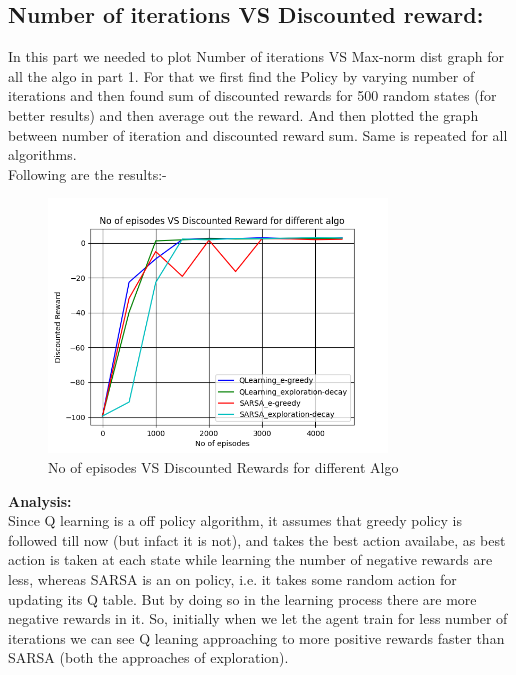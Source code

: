\documentclass{article}
\begin{document}
\begin{enumerate}[a)]
\subsection{Number of iterations VS Discounted reward:}
In this part we needed to plot Number of iterations VS Max-norm dist graph for all the algo in part 1. For that we first find the Policy by varying number of iterations and then found 
sum of discounted rewards for 500 random states (for better results) and then average out the reward. And then plotted the graph between number of iteration and discounted reward sum. Same is repeated for all algorithms.\\
Following are the results:-


\begin{center}
    \begin{figure}[H]
    \hfill\includegraphics[width=9cm]{QB2.png}\hspace*{\fill}
    \caption{No of episodes VS Discounted Rewards for different Algo}
    \label{fig:No of episodes VS Discounted Rewards for different Algo}
\end{figure}
\end{center}

\textbf{Analysis:\\ }
Since Q learning is a off policy algorithm, it assumes that greedy policy is followed till now (but infact it is not), and takes the best action availabe, as best action is taken at each state while learning the number of negative rewards are less, whereas SARSA is an on 
policy, i.e. it takes some random action for updating its Q table. But by doing so in the learning process there are more negative rewards in it. So, initially when we let the agent train for less number of iterations we can see Q leaning approaching to more positive rewards faster than 
SARSA (both the approaches of exploration).\\


\end{enumerate}
\end{document}
